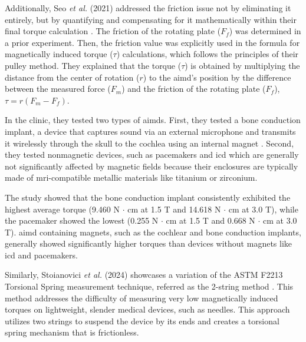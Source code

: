 Additionally, Seo \textit{et al.} (2021) addressed the friction issue not by eliminating it entirely, but by quantifying and compensating for it mathematically within their final torque calculation \cite{Seo2021767}. The friction of the rotating plate ($F_f$) was determined in a prior experiment. Then, the friction value was explicitly used in the formula for magnetically induced torque ($\tau$) calculations, which follows the principles of their pulley method. They explained that the torque ($\tau$) is obtained by multiplying the distance from the center of rotation ($r$) to the \gls{aimd}’s position by the difference between the measured force ($F_m$) and the friction of the rotating plate ($F_f$), $\tau = r (F_m - F_f)$.

In the clinic, they tested two types of \glspl{aimd}. First, they tested a bone conduction implant, a device that captures sound via an external microphone and transmits it wirelessly through the skull to the cochlea using an internal magnet \cite{Seo2021767}. Second, they tested nonmagnetic devices, such as pacemakers and \gls{icd} which are generally not significantly affected by magnetic fields because their enclosures are typically made of \gls{mri}-compatible metallic materials like titanium or zirconium.

The study showed that the bone conduction implant consistently exhibited the highest average torque (9.460 N $\cdot$ cm at 1.5 T and 14.618 N $\cdot$ cm at 3.0 T), while the pacemaker showed the lowest (0.255 N $\cdot$ cm at 1.5 T and 0.668 N $\cdot$ cm at 3.0 T). \gls{aimd} containing magnets, such as the cochlear and bone conduction implants, generally showed significantly higher torques than devices without magnets like \gls{icd} and pacemakers.



Similarly, Stoianovici \textit{et al.} (2024) showcases a variation of the ASTM F2213 Torsional Spring measurement technique, referred as the 2-string method \cite{stoianovici2024}. This method addresses the difficulty of measuring very low magnetically induced torques on lightweight, slender medical devices, such as needles. This approach utilizes two strings to suspend the device by its ends and creates a torsional spring mechanism that is frictionless.


